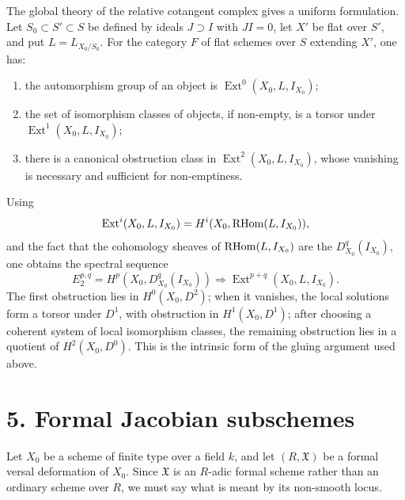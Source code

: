 \documentclass[11pt]{article}
\providecommand{\Ext}{\operatorname{Ext}}
\begin{document}
The global theory of the relative cotangent complex gives a uniform formulation. Let \(S_0\subset S'\subset S\) be defined by ideals \(J\supset I\) with \(JI=0\), let \(X'\) be flat over \(S'\), and put \(L=L_{X_0/S_0}\). For the category \(F\) of flat schemes over \(S\) extending \(X'\), one has:
\begin{enumerate}[label=(\alph*)]
\item the automorphism group of an object is \(\Ext^0(X_0,L,I_{X_0})\);
\item the set of isomorphism classes of objects, if non-empty, is a torsor under \(\Ext^1(X_0,L,I_{X_0})\);
\item there is a canonical obstruction class in \(\Ext^2(X_0,L,I_{X_0})\), whose vanishing is necessary and sufficient for non-emptiness.
\end{enumerate}
Using
\[
 \Ext^i(X_0,L,I_{X_0})=H^i(X_0,\RHom(L,I_{X_0})),
\]
and the fact that the cohomology sheaves of \(\operatorname{RHom}(L,I_{X_0})\) are the \(D^q_{X_0}(I_{X_0})\), one obtains the spectral sequence
\[
 E^{p,q}_2=H^p(X_0,D^q_{X_0}(I_{X_0}))
 \Longrightarrow \Ext^{p+q}(X_0,L,I_{X_0}).
\]
The first obstruction lies in \(H^0(X_0,D^2)\); when it vanishes, the local solutions form a torsor under \(D^1\), with obstruction in \(H^1(X_0,D^1)\); after choosing a coherent system of local isomorphism classes, the remaining obstruction lies in a quotient of \(H^2(X_0,D^0)\). This is the intrinsic form of the gluing argument used above.


\section*{5. Formal Jacobian subschemes}

Let \(X_0\) be a scheme of finite type over a field \(k\), and let \((R,\mathfrak X)\) be a formal versal deformation of \(X_0\). Since \(\mathfrak X\) is an \(R\)-adic formal scheme rather than an ordinary scheme over \(R\), we must say what is meant by its non-smooth locus.
\end{document}
